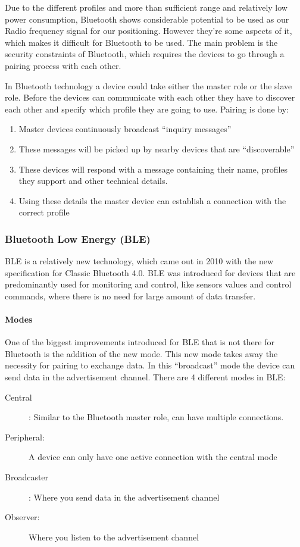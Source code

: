 Due to the different profiles and more than sufficient range and relatively
low power consumption, Bluetooth shows considerable potential to be
used as our Radio frequency signal for our positioning. However they\textquoteright re
some aspects of it, which makes it difficult for Bluetooth to be used.
The main problem is the security constraints of Bluetooth, which requires
the devices to go through a pairing process with each other. 

In Bluetooth technology a device could take either the master role
or the slave role. Before the devices can communicate with each other
they have to discover each other and specify which profile they are
going to use. Pairing is done by: 
\begin{enumerate}
\item Master devices continuously broadcast \textquotedblleft inquiry messages\textquotedblright{}
\item These messages will be picked up by nearby devices that are \textquotedblleft discoverable\textquotedblright{} 
\item These devices will respond with a message containing their name, profiles
they support and other technical details. 
\item Using these details the master device can establish a connection with
the correct profile 
\end{enumerate}

\subsubsection{Bluetooth Low Energy (BLE)}

BLE is a relatively new technology, which came out in 2010 with the
new specification for Classic Bluetooth 4.0. BLE was introduced for
devices that are predominantly used for monitoring and control, like
sensors values and control commands, where there is no need for large
amount of data transfer.


\paragraph*{Modes\protect \\
}

One of the biggest improvements introduced for BLE that is not there
for Bluetooth is the addition of the new mode. This new mode takes
away the necessity for pairing to exchange data. In this \textquotedblleft broadcast\textquotedblright{}
mode the device can send data in the advertisement channel. There
are 4 different modes in BLE: 
\begin{description}
\item [{Central}] : Similar to the Bluetooth master role, can have multiple
connections. 
\item [{Peripheral:}] A device can only have one active connection with
the central mode 
\item [{Broadcaster}] : Where you send data in the advertisement channel
\item [{Observer:}] Where you listen to the advertisement channel
\end{description}


